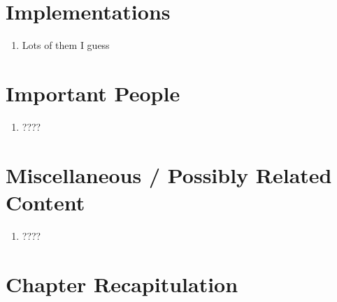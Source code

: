 \documentclass[thesis-solanki.tex]{subfiles}
\begin{document}
\section{Implementations}
\begin{enumerate}
\item Lots of them I guess
\end{enumerate}

\section{Important People}
\begin{enumerate}
\item ????
\end{enumerate}

\section{Miscellaneous / Possibly Related Content}
\begin{enumerate}
\item ????
\end{enumerate}

\section{Chapter Recapitulation}


\ifMain
\begin{scope}
  \nolinenumbers
  \enotesize
  \par
  \begin{singlespace}
  \setlength{\parskip}{12pt plus 2pt minus 1pt}
  \theendnotes
  \par
  \end{singlespace}
\end{scope}
\fi
\end{document}

